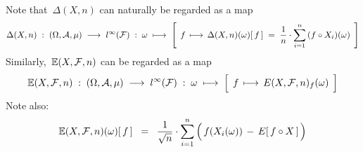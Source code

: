 \begin{remark}\mbox{}
\vskip 0.1cm
\noindent
Note that \,$\Delta(X,n)$ can naturally be regarded as a map
\begin{equation*}
\Delta(X,n) \; : \; (\Omega,\mathcal{A},\mu) \;\longrightarrow\; l^{\infty}(\mathcal{F})
\; : \; \omega \;\longmapsto\;
	\left[\;\,
	f
	\,\overset{{\color{white}+}}{\longmapsto}\,
		\Delta(X,n)(\omega)[\,f\,]
		\;=\; \dfrac{1}{n}\cdot \overset{n}{\underset{i=1}{\sum}}\,(f \circ X_{i})(\omega)
	\,\;\right]
\end{equation*}
Similarly, \,$\mathbb{E}(X,\mathcal{F},n)$ can be regarded as a map
\begin{equation*}
\E(X,\mathcal{F},n) \; : \; (\Omega,\mathcal{A},\mu) \;\longrightarrow\; l^{\infty}(\mathcal{F})
\; : \; \omega \;\longmapsto\; \left[\;\, f \,\overset{{\color{white}+}}{\longmapsto}\, E(X,\mathcal{F},n)_{f}(\omega) \,\;\right]
\end{equation*}
Note also:
\begin{equation*}
\E(X,\mathcal{F},n)(\omega)[\,f\,]
\;\; = \;\;
	 \dfrac{1}{\sqrt{n}}
	 \cdot
	 \overset{n}{\underset{i=1}{\sum}}\left(\,f(X_{i}(\omega)) \,\overset{{\color{white}.}}{-}\, E[\,f \circ X\,]\,\right)
\end{equation*}
\end{remark}

